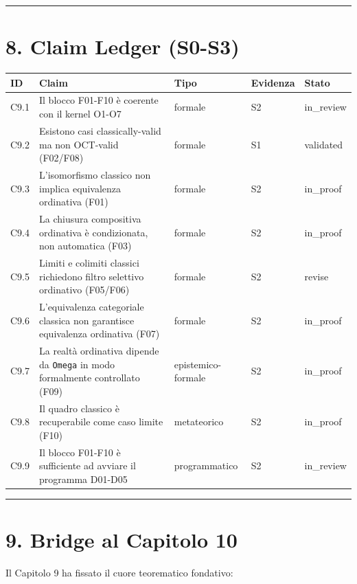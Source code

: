 \begin{center}\rule{0.5\linewidth}{0.5pt}\end{center}

\section{8. Claim Ledger (S0-S3)}

{\def\LTcaptype{none} %
\begin{longtable}[]{@{}lllll@{}}
\toprule\noalign{}
ID & Claim & Tipo & Evidenza & Stato \\
\midrule\noalign{}
\endhead
\bottomrule\noalign{}
\endlastfoot
C9.1 & Il blocco F01-F10 è coerente con il kernel O1-O7 & formale & S2 & in\_review \\
C9.2 & Esistono casi classically-valid ma non OCT-valid (F02/F08) & formale & S1 & validated \\
C9.3 & L'isomorfismo classico non implica equivalenza ordinativa (F01) & formale & S2 & in\_proof \\
C9.4 & La chiusura compositiva ordinativa è condizionata, non automatica (F03) & formale & S2 & in\_proof \\
C9.5 & Limiti e colimiti classici richiedono filtro selettivo ordinativo (F05/F06) & formale & S2 & revise \\
C9.6 & L'equivalenza categoriale classica non garantisce equivalenza ordinativa (F07) & formale & S2 & in\_proof \\
C9.7 & La realtà ordinativa dipende da \texttt{Omega} in modo formalmente controllato (F09) & epistemico-formale & S2 & in\_proof \\
C9.8 & Il quadro classico è recuperabile come caso limite (F10) & metateorico & S2 & in\_proof \\
C9.9 & Il blocco F01-F10 è sufficiente ad avviare il programma D01-D05 & programmatico & S2 & in\_review \\
\end{longtable}
}

\begin{center}\rule{0.5\linewidth}{0.5pt}\end{center}

\section{9. Bridge al Capitolo 10}

Il Capitolo 9 ha fissato il cuore teorematico fondativo:

